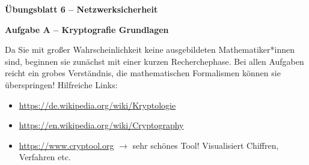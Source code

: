 \documentclass[paper=a4,fontsize=11pt]{scrartcl}%
\numberwithin{equation}{section}
\begin{document}
\begin{center}
\Large{\textbf{Übungsblatt 6 -- Netzwerksicherheit}}
\end{center}


\begin{center}\Large{\textbf{Aufgabe A -- Kryptografie Grundlagen}}\end{center}
Da Sie mit großer Wahrscheinlichkeit keine ausgebildeten Mathematiker*innen sind, beginnen sie zunächst mit einer kurzen Recherchephase. Bei allen Aufgaben reicht ein grobes Verständnis, die mathematischen Formalismen können sie überspringen!
Hilfreiche Links:
\begin{itemize}
	\item \url{https://de.wikipedia.org/wiki/Kryptologie}
	\item \url{https://en.wikipedia.org/wiki/Cryptography}
	\item \url{https://www.cryptool.org} $\rightarrow$ sehr schönes Tool! Visualisiert Chiffren, Verfahren etc.
\end{itemize}
\end{document}
